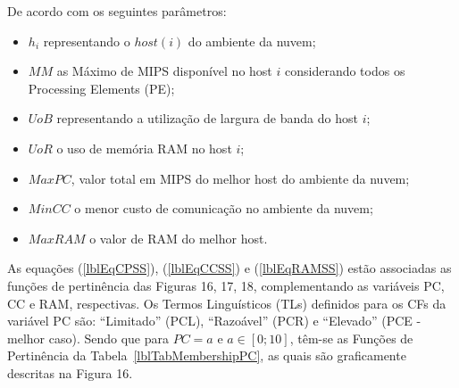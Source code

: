 \documentclass[tcc,capa]{texufpel}
\begin{document}
De acordo com os seguintes parâmetros:

\begin{itemize}
\item $h_i$ representando o $host(i)$ do ambiente da nuvem; 
\item $MM$ as  Máximo de MIPS disponível no  host $i$ considerando todos os Processing Elements (PE);
\item $UoB$ representando a utilização de largura de banda do host $i$;
\item $UoR$ o uso de memória RAM no host $i$;
\item $MaxPC$, valor total em MIPS do melhor host do ambiente da nuvem;
\item $MinCC$ o menor custo de comunicação no ambiente da nuvem;
\item $MaxRAM$ o valor de RAM do melhor host.
\end{itemize}

As equações (\ref{lblEqCPSS}), (\ref{lblEqCCSS}) e (\ref{lblEqRAMSS}) estão associadas as funções de pertinência das Figuras 16, 17, 18, complementando as variáveis PC, CC e RAM, respectivas.
Os Termos Linguísticos (TLs) definidos para os CFs da variável PC são: ``Limitado'' (PCL), ``Razoável'' (PCR) e ``Elevado'' (PCE - melhor caso). Sendo que para $PC = a$ e $a \in [0;10]$, têm-se as Funções de Pertinência da Tabela~\ref{lblTabMembershipPC}, as quais são graficamente descritas na Figura 16.
\end{document}
